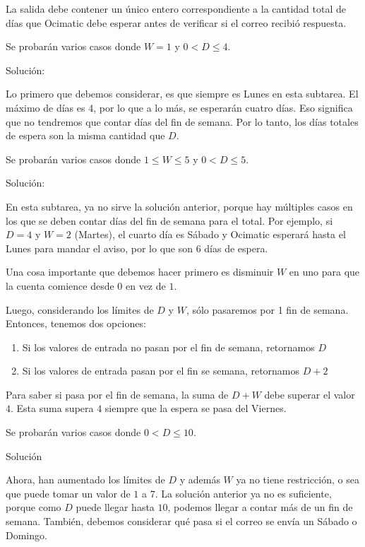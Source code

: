 \documentclass{oci}
\begin{document}
\begin{outputDescription}
  La salida debe contener un único entero correspondiente a la cantidad total de
  días que Ocimatic debe esperar antes de verificar si el correo recibió
  respuesta.
\end{outputDescription}

\newpage
\begin{scoreDescription}
   Se probarán varios casos donde $W=1$ y $0 < D \leq 4$.

  Soluci\'on:

  Lo primero que debemos considerar, es que siempre es Lunes en esta subtarea.
  El máximo de días es 4, por lo que a lo más, se esperarán cuatro días. Eso
  significa que no tendremos que contar días del fin de semana. Por lo tanto, los
  días totales de espera son la misma cantidad que $D$.

   Se probarán varios casos donde $1 \leq W \leq 5$ y $0 < D \leq 5$.

  Soluci\'on:

  En esta subtarea, ya no sirve la soluci\'on anterior, porque hay m\'ultiples casos
  en los que se deben contar d\'ias del fin de semana para el total. Por ejemplo, si 
  $D = 4$ y $W = 2$ (Martes), el cuarto d\'ia es S\'abado y Ocimatic esperar\'a hasta
  el Lunes para mandar el aviso, por lo que son 6 d\'ias de espera.

  Una cosa importante que debemos hacer primero es disminuir $W$ en uno para que
  la cuenta comience desde $0$ en vez de $1$.

  Luego, considerando los l\'imites de $D$ y $W$, s\'olo pasaremos por 1 fin 
  de semana. Entonces, tenemos dos opciones:
  \begin{enumerate}
    \item Si los valores de entrada no pasan por el fin de semana, retornamos $D$
    \item Si los valores de entrada pasan por el fin se semana, retornamos $D+2$
  \end{enumerate}

  Para saber si pasa por el fin de semana, la suma de $D + W$ debe superar el valor $4$.
  Esta suma supera $4$ siempre que la espera se pasa del Viernes.

   Se probarán varios casos donde $0 < D \leq 10$.
  
  Soluci\'on

  Ahora, han aumentado los l\'imites de $D$ y adem\'as $W$ ya no tiene restricci\'on,
  o sea que puede tomar un valor de $1$ a $7$. La soluci\'on anterior ya no es suficiente,
  porque como $D$ puede llegar hasta $10$, podemos llegar a contar m\'as de un fin de 
  semana. Tambi\'en, debemos considerar qu\'e pasa si el correo se env\'ia un S\'abado
  o Domingo.


\end{scoreDescription}
\end{document}
